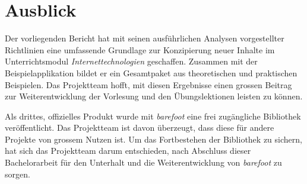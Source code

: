 \section{Ausblick}

Der vorliegenden Bericht hat mit seinen ausführlichen Analysen vorgestellter Richtlinien eine umfassende Grundlage zur Konzipierung neuer Inhalte im Unterrichtsmodul \emph{Internettechnologien} geschaffen. Zusammen mit der Beispielapplikation bildet er ein Gesamtpaket aus theoretischen und praktischen Beispielen. Das Projektteam hofft, mit diesen Ergebnisse einen grossen Beitrag zur Weiterentwicklung der Vorlesung und den Übungslektionen leisten zu können.

Als drittes, offizielles Produkt wurde mit \emph{barefoot} eine frei zugängliche Bibliothek veröffentlicht. Das Projektteam ist davon überzeugt, dass diese für andere Projekte von grossem Nutzen ist. Um das Fortbestehen der Bibliothek zu sichern, hat sich das Projektteam darum entschieden, nach Abschluss dieser Bachelorarbeit für den Unterhalt und die Weiterentwicklung von \emph{barefoot} zu sorgen.